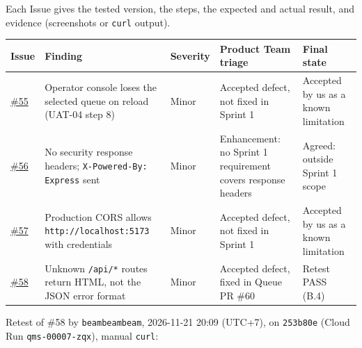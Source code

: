 


Each Issue gives the tested version, the steps, the expected and actual result, and evidence (screenshots or \texttt{curl} output).

\begin{longtable}{@{}R{1.1cm}R{5cm}R{1.3cm}R{4cm}R{3.4cm}@{}}
\toprule \textbf{Issue} & \textbf{Finding} & \textbf{Severity} & \textbf{Product Team triage} & \textbf{Final state} \\ \midrule \endhead
\href{https://github.com/MacOverlorD/Queue_and_Service_Management_System_37-39/issues/55}{\#55} & Operator console loses the selected queue on reload (UAT-04 step 8) & Minor & Accepted defect, not fixed in Sprint 1 & Accepted by us as a known limitation \\
\href{https://github.com/MacOverlorD/Queue_and_Service_Management_System_37-39/issues/56}{\#56} & No security response headers; \texttt{X-Powered-By: Express} sent & Minor & Enhancement: no Sprint 1 requirement covers response headers & Agreed: outside Sprint 1 scope \\
\href{https://github.com/MacOverlorD/Queue_and_Service_Management_System_37-39/issues/57}{\#57} & Production CORS allows \texttt{http://localhost:5173} with credentials & Minor & Accepted defect, not fixed in Sprint 1 & Accepted by us as a known limitation \\
\href{https://github.com/MacOverlorD/Queue_and_Service_Management_System_37-39/issues/58}{\#58} & Unknown \texttt{/api/*} routes return HTML, not the JSON error format & Minor & Accepted defect, fixed in Queue PR \#60 & Retest PASS (B.4) \\
\bottomrule
\end{longtable}


Retest of \#58 by \texttt{beambeambeam}, 2026-11-21 20:09 (UTC+7), on \texttt{253b80e} (Cloud Run \texttt{qms-00007-zqx}), manual \texttt{curl}:


